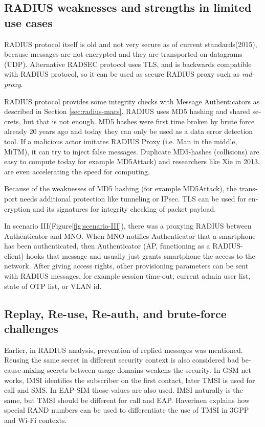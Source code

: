 \documentclass[12pt,a4paper,english]{tutthesis}
\begin{document}
\begin{otherlanguage}{english}
\subsection{RADIUS weaknesses and strengths in limited use cases}
\label{sec-6-1-4}


RADIUS protocol itself is old and not very secure as of current
standards(2015), because messages are not encrypted and they are
transported on datagrams (UDP). Alternative RADSEC protocol uses TLS, and 
is backwards compatible with RADIUS protocol, so it can be used
as secure RADIUS proxy such as \emph{radproxy}\cite{uninett-radproxy}.

RADIUS protocol provides some integrity checks with Message
Authenticators as described in Section \ref{sec:radius-macs}.  RADIUS uses
MD5 hashing and shared secrets, but that is not enough.  MD5 hashes
were first time broken by brute force already 20 years ago and today
they can only be used as a data error detection
tool\cite[p.2]{rfc6151}.  If a malicious actor imitates RADIUS Proxy
(i.e. Man in the middle, MiTM), it can try to inject false messages.
Duplicate MD5-hashes (collisions) are easy to compute today for
example MD5Attack\cite{rfc5176}) and researchers like Xie in
2013\cite{xie2013fast}.  are even accelerating the speed for
computing.

 Because of the weaknesses of MD5 hashing (for example
MD5Attack\cite{rfc5176}), the transport needs additional protection
like tunneling or IPsec. TLS can be used for encryption and its
signatures for integrity checking of packet payload.





In scenario III(Figure\ref{fig:scenario-III}),  there was a proxying RADIUS between Authenticator
and MNO.  When MNO notifies Authenticator
that a smartphone has been authenticated, then Authenticator (AP, functioning
as a RADIUS-client) hooks that message and usually just grants
smartphone the access to the network. After giving access rights, other
provisioning parameters can be sent with RADIUS messages, for example
session time-out,
current admin user list, state of OTP list, or VLAN id.


\subsection{Replay, Re-use, Re-auth, and brute-force challenges}
\label{sec-6-1-5}

Earlier, in RADIUS analysis, prevention of replied messages was
mentioned. Reusing the same secret in different security context is also
considered bad because mixing secrets between usage
domains weakens the security.  In GSM networks, IMSI identifies the subscriber on
the first contact, later TMSI is used for call and SMS.  In EAP-SIM those
values are also used. IMSI naturally is the same, but TMSI should be
different for call and EAP.  Haverinen\cite{hav-doc} explains how
special RAND numbers can be used to differentiate the use of TMSI in 3GPP and Wi-Fi
contexts.


\end{otherlanguage}
\end{document}
